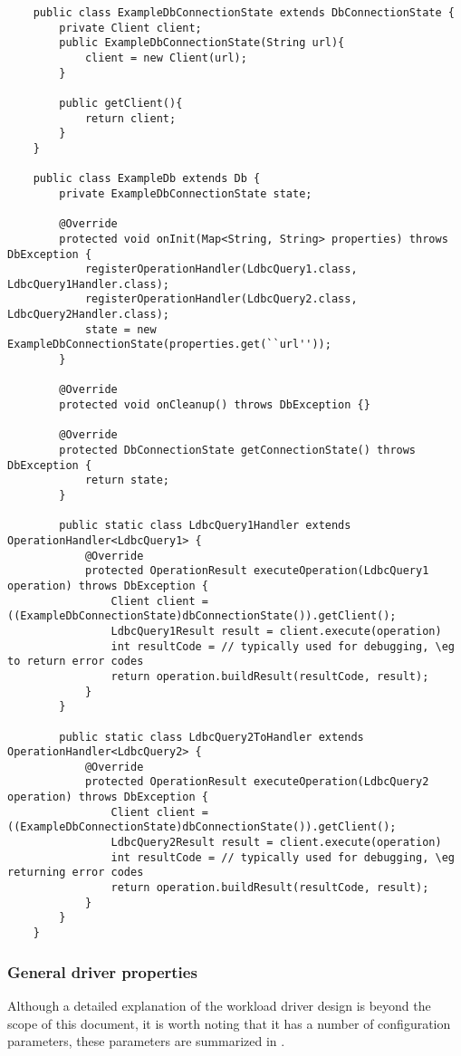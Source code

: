 {\footnotesize
	\begin{verbatim}
    public class ExampleDbConnectionState extends DbConnectionState {
        private Client client;
        public ExampleDbConnectionState(String url){
            client = new Client(url);
        }

        public getClient(){
            return client;
        }
    }

    public class ExampleDb extends Db {
        private ExampleDbConnectionState state;

        @Override
        protected void onInit(Map<String, String> properties) throws DbException {
            registerOperationHandler(LdbcQuery1.class, LdbcQuery1Handler.class);
            registerOperationHandler(LdbcQuery2.class, LdbcQuery2Handler.class);
            state = new ExampleDbConnectionState(properties.get(``url''));
        }

        @Override
        protected void onCleanup() throws DbException {}

        @Override
        protected DbConnectionState getConnectionState() throws DbException {
            return state;
        }

        public static class LdbcQuery1Handler extends OperationHandler<LdbcQuery1> {
            @Override
            protected OperationResult executeOperation(LdbcQuery1 operation) throws DbException {
                Client client = ((ExampleDbConnectionState)dbConnectionState()).getClient();
                LdbcQuery1Result result = client.execute(operation)
                int resultCode = // typically used for debugging, \eg to return error codes
                return operation.buildResult(resultCode, result);
            }
        }

        public static class LdbcQuery2ToHandler extends OperationHandler<LdbcQuery2> {
            @Override
            protected OperationResult executeOperation(LdbcQuery2 operation) throws DbException {
                Client client = ((ExampleDbConnectionState)dbConnectionState()).getClient();
                LdbcQuery2Result result = client.execute(operation)
                int resultCode = // typically used for debugging, \eg returning error codes
                return operation.buildResult(resultCode, result);
            }
        }
    }
	\end{verbatim}
}

\subsubsection{General driver properties}
\label{ssub:general_driver_properties}
Although a detailed explanation of the workload driver design is beyond the
scope of this document, it is worth noting that it has a number of
configuration parameters, these parameters are summarized in
.

